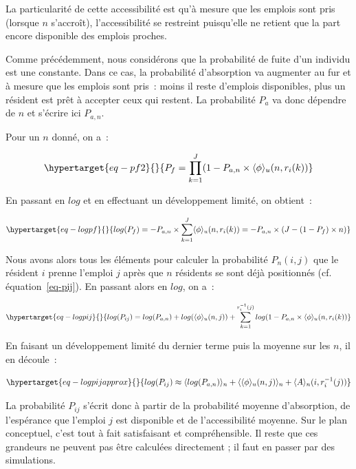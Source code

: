 \documentclass[
  10pt,
  a4paper,
  numbers=noendperiod,
  DIV=9]{scrartcl}
\begin{document}
La particularité de cette accessibilité est qu'à mesure que les emplois
sont pris (lorsque \(n\) s'accroît), l'accessibilité se restreint
puisqu'elle ne retient que la part encore disponible des emplois
proches.

Comme précédemment, nous considérons que la probabilité de fuite d'un
individu est une constante. Dans ce cas, la probabilité d'absorption va
augmenter au fur et à mesure que les emplois sont pris~: moins il reste
d'emplois disponibles, plus un résident est prêt à accepter ceux qui
restent. La probabilité \(P_a\) va donc dépendre de \(n\) et s'écrire
ici \(P_{a,n}\).

Pour un \(n\) donné, on a~:

\begin{equation}\protect\hypertarget{eq-pf2}{}{
P_f=\prod_{k=1}^J(1-P_{a,n}\times \langle \phi \rangle_u(n, r_i(k))
}\label{eq-pf2}\end{equation}

En passant en \(log\) et en effectuant un développement limité, on
obtient~:

\begin{equation}\protect\hypertarget{eq-logpf}{}{
log(P_f)=-P_{a,n}\times\sum_{k=1}^J \langle \phi \rangle_u(n,r_i(k))=-P_{a,n}\times(J-(1-P_f)\times n)
}\label{eq-logpf}\end{equation}

Nous avons alors tous les éléments pour calculer la probabilité
\(P_n(i,j)\) que le résident \(i\) prenne l'emploi \(j\) après que \(n\)
résidents se sont déjà positionnés (cf. équation~\ref{eq-pij}). En
passant alors en \(log\), on a~:

\begin{equation}\protect\hypertarget{eq-logpij}{}{
log(P_{ij})=log(P_{a,n})+log(\langle\phi \rangle_u(n,j))+\sum_{k=1}^{r_i^{-1}(j)}log(1-P_{a,n}\times \langle \phi \rangle_u(n,r_i(k))
}\label{eq-logpij}\end{equation}

En faisant un développement limité du dernier terme puis la moyenne sur
les \(n\), il en découle~:

\begin{equation}\protect\hypertarget{eq-logpijapprox}{}{
log(P_{ij})\approx\langle log(P_{a,n})\rangle _n+\langle\langle\phi\rangle_u(n,j)\rangle_n + \langle A\rangle_n(i, r_i^{-1}(j))
}\label{eq-logpijapprox}\end{equation}

La probabilité \(P_{ij}\) s'écrit donc à partir de la probabilité
moyenne d'absorption, de l'espérance que l'emploi \(j\) est disponible
et de l'accessibilité moyenne. Sur le plan conceptuel, c'est tout à fait
satisfaisant et compréhensible. Il reste que ces grandeurs ne peuvent
pas être calculées directement ; il faut en passer par des simulations.
\end{document}
